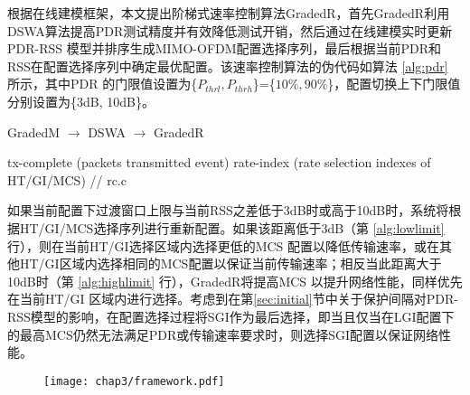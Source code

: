 根据在线建模框架，本文提出阶梯式速率控制算法GradedR，首先GradedR利用DSWA算法提高PDR测试精度并有效降低测试开销，然后通过在线建模实时更新PDR-RSS 模型并排序生成MIMO-OFDM配置选择序列，最后根据当前PDR和RSS在配置选择序列中确定最优配置。该速率控制算法的伪代码如算法 \ref{alg:pdr} 所示，其中PDR 的门限值设置为\{$P_{thrl},P_{thrh}$\}=\{$10\%,90\%$\}，配置切换上下门限值分别设置为\{3dB, 10dB\}。

\begin{algorithm}[!htp]
\renewcommand{\algorithmicrequire}{\textbf{输入：}}
\renewcommand{\algorithmicensure}{\textbf{输出：}}
\caption{GradedM $\rightarrow$ DSWA $\rightarrow$ GradedR}
\label{alg:pdr}
\begin{algorithmic}[1]
\Require tx-complete (packets transmitted event)
\Ensure  rate-index (rate selection indexes of HT/GI/MCS)
 \label{alg:lowlimit}
 // rc.c
\EndIf
{} \label{alg:highlimit}
\EndIf
\State {}
\end{algorithmic}
\end{algorithm}

如果当前配置下过渡窗口上限与当前RSS之差低于3dB时或高于10dB时，系统将根据HT/GI/MCS选择序列进行重新配置。如果该距离低于3dB（第 \ref{alg:lowlimit} 行），则在当前HT/GI选择区域内选择更低的MCS 配置以降低传输速率，或在其他HT/GI区域内选择相同的MCS配置以保证当前传输速率；相反当此距离大于10dB时（第 \ref{alg:highlimit} 行），GradedR将提高MCS 以提升网络性能，同样优先在当前HT/GI 区域内进行选择。考虑到在第\ref{sec:initial}节中关于保护间隔对PDR-RSS模型的影响，在配置选择过程将SGI作为最后选择，即当且仅当在LGI配置下的最高MCS仍然无法满足PDR或传输速率要求时，则选择SGI配置以保证网络性能。

\begin{figure}[!htp]
\centering
\texttt{[image: chap3/framework.pdf]}
\end{figure}

